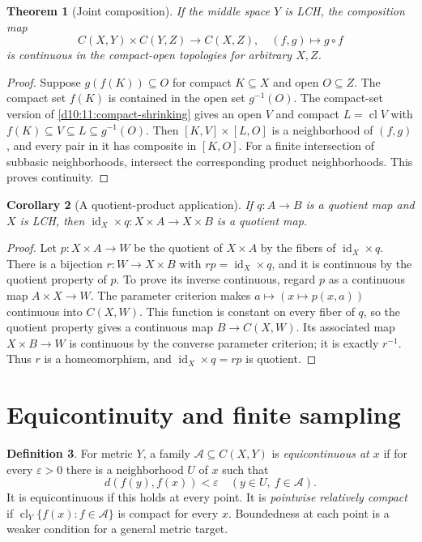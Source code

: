 \documentclass[11pt,oneside,openany]{book}
\newtheorem{theorem}{Theorem}[chapter]
\newtheorem{corollary}[theorem]{Corollary}
\theoremstyle{definition}
\newtheorem{definition}[theorem]{Definition}
\theoremstyle{remark}
\newcommand{\eps}{\varepsilon}
\DeclareMathOperator{\id}{id}
\DeclareMathOperator{\cl}{cl}
\begin{document}
\begin{theorem}[Joint composition]\label{d10:13:composition}
If the middle space $Y$ is LCH, the composition map
\[
 C(X,Y)\times C(Y,Z)\longrightarrow C(X,Z),\quad(f,g)\mapsto g\circ f
\]
is continuous in the compact-open topologies for arbitrary $X,Z$.
\end{theorem}
\begin{proof}
Suppose $g(f(K))\subseteq O$ for compact $K\subseteq X$ and open $O\subseteq Z$. The compact set $f(K)$ is contained in the open set $g^{-1}(O)$. The compact-set version of \cref{d10:11:compact-shrinking} gives an open $V$ and compact $L=\cl V$ with $f(K)\subseteq V\subseteq L\subseteq g^{-1}(O)$. Then $[K,V]\times[L,O]$ is a neighborhood of $(f,g)$, and every pair in it has composite in $[K,O]$. For a finite intersection of subbasic neighborhoods, intersect the corresponding product neighborhoods. This proves continuity.
\end{proof}

\begin{corollary}[A quotient-product application]\label{d10:13:quotient-product}
If $q:A\to B$ is a quotient map and $X$ is LCH, then $\id_X\times q:X\times A\to X\times B$ is a quotient map.
\end{corollary}
\begin{proof}
Let $p:X\times A\to W$ be the quotient of $X\times A$ by the fibers of $\id_X\times q$. There is a bijection $r:W\to X\times B$ with $rp=\id_X\times q$, and it is continuous by the quotient property of $p$. To prove its inverse continuous, regard $p$ as a continuous map $A\times X\to W$. The parameter criterion makes $a\mapsto(x\mapsto p(x,a))$ continuous into $C(X,W)$. This function is constant on every fiber of $q$, so the quotient property gives a continuous map $B\to C(X,W)$. Its associated map $X\times B\to W$ is continuous by the converse parameter criterion; it is exactly $r^{-1}$. Thus $r$ is a homeomorphism, and $\id_X\times q=rp$ is quotient.
\end{proof}

\section{Equicontinuity and finite sampling}

\begin{definition}\label{d10:13:equicontinuity}
For metric $Y$, a family $\mathcal A\subseteq C(X,Y)$ is \emph{equicontinuous at $x$} if for every $\eps>0$ there is a neighborhood $U$ of $x$ such that
\[
 d(f(y),f(x))<\eps\quad(y\in U,\ f\in\mathcal A).
\]
It is equicontinuous if this holds at every point. It is \emph{pointwise relatively compact} if $\cl_Y\{f(x):f\in\mathcal A\}$ is compact for every $x$. Boundedness at each point is a weaker condition for a general metric target.
\end{definition}
\end{document}
